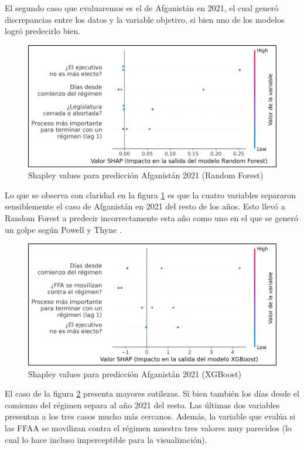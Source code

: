 \documentclass{article}
\begin{document}
El segundo caso que evaluaremos es el de Afganistán en 2021, el cual generó discrepancias entre los
datos y la variable objetivo, si bien uno de los modelos logró predecirlo bien.

\begin{figure}[H]
  \centering
  \includegraphics[width=1\textwidth]{13_shapley_values_rf_afganistan.png}
  \caption{Shapley values para predicción Afganistán 2021 (Random Forest)\label{fig:shapley_rf_afganistan}}
\end{figure}

Lo que se observa con claridad en la figura \ref{fig:shapley_rf_afganistan} es que la cuatro variables
separaron sensiblemente el caso de Afganistán en 2021 del resto de los años. Esto llevó a Random Forest
a predecir incorrectamente esta año como uno en el que se generó un golpe según Powell y Thyne 
\citeyear{Pow11}.

\begin{figure}[H]
  \centering
  \includegraphics[width=1\textwidth]{14_shapley_values_xgb_afganistan.png}
  \caption{Shapley values para predicción Afganistán 2021 (XGBoost)\label{fig:shapley_xgb_afganistan}}
\end{figure}

El caso de la figura \ref{fig:shapley_xgb_afganistan} presenta mayores sutilezas. Si bien también
los días desde el comienzo del régimen separa al año 2021 del resto. Las últimas dos variables 
presentan a los tres casos mucho más cercanos. Además, la variable que evalúa si las FFAA se movilizan
contra el régimen muestra tres valores muy parecidos (lo cual lo hace incluso imperceptible para la
visualización).
\end{document}
